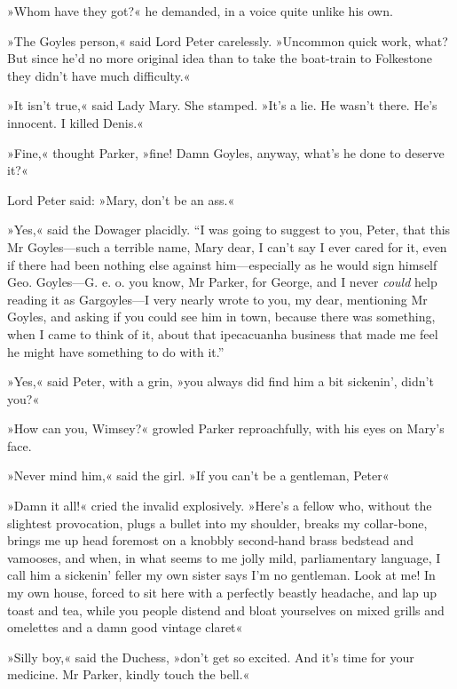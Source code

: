 »Whom have they got?« he demanded, in a voice quite unlike his own.

»The Goyles person,« said Lord Peter carelessly. »Uncommon quick work, what? But since he'd no more original idea than to take the boat-train to Folkestone they didn't have much difficulty.«

»It isn't true,« said Lady Mary. She stamped. »It's a lie. He wasn't there. He's innocent. I killed Denis.«

»Fine,« thought Parker, »fine! Damn Goyles, anyway, what's he done to deserve it?«

Lord Peter said: »Mary, don't be an ass.«

»Yes,« said the Dowager placidly. \enquote{I was going to suggest to you, Peter, that this Mr Goyles\allowbreak---\allowbreak such a terrible name, Mary dear, I can't say I ever cared for it, even if there had been nothing else against him\allowbreak---\allowbreak especially as he would sign himself Geo. Goyles\allowbreak---\allowbreak G. e. o. you know, Mr Parker, for George, and I never \textit{could} help reading it as Gargoyles\allowbreak---\allowbreak I very nearly wrote to you, my dear, mentioning Mr Goyles, and asking if you could see him in town, because there was something, when I came to think of it, about that ipecacuanha business that made me feel he might have something to do with it.}

»Yes,« said Peter, with a grin, »you always did find him a bit sickenin', didn't you?«

»How can you, Wimsey?« growled Parker reproachfully, with his eyes on Mary's face.

»Never mind him,« said the girl. »If you can't be a gentleman, Peter\longdash«

»Damn it all!« cried the invalid explosively. »Here's a fellow who, without the slightest provocation, plugs a bullet into my shoulder, breaks my collar-bone, brings me up head foremost on a knobbly second-hand brass bedstead and vamooses, and when, in what seems to me jolly mild, parliamentary language, I call him a sickenin' feller my own sister says I'm no gentleman. Look at me! In my own house, forced to sit here with a perfectly beastly headache, and lap up toast and tea, while you people distend and bloat yourselves on mixed grills and omelettes and a damn good vintage claret\longdash«

»Silly boy,« said the Duchess, »don't get so excited. And it's time for your medicine. Mr Parker, kindly touch the bell.«

